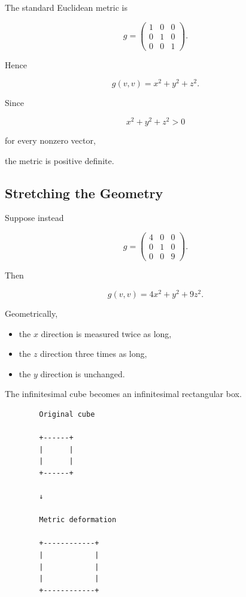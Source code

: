 \documentclass[12pt,a4paper]{article}
\theoremstyle{notespace}
\begin{document}
The standard Euclidean metric is

\[
g=
\begin{pmatrix}
	1&0&0\\
	0&1&0\\
	0&0&1
\end{pmatrix}.
\]

Hence

\[
g(v,v)
=
x^2+y^2+z^2.
\]

Since

\[
x^2+y^2+z^2>0
\]

for every nonzero vector,

the metric is positive definite.


\subsection{Stretching the Geometry}

Suppose instead

\[
g=
\begin{pmatrix}
	4&0&0\\
	0&1&0\\
	0&0&9
\end{pmatrix}.
\]

Then

\[
g(v,v)
=
4x^2+y^2+9z^2.
\]

Geometrically,

\begin{itemize}
	\item the $x$ direction is measured twice as long,
	\item the $z$ direction three times as long,
	\item the $y$ direction is unchanged.
\end{itemize}

The infinitesimal cube becomes an infinitesimal rectangular box.

\bigskip

\begin{center}
	\begin{verbatim}
		Original cube
		
		+------+
		|      |
		|      |
		+------+
		
		↓
		
		Metric deformation
		
		+------------+
		|            |
		|            |
		|            |
		+------------+
	\end{verbatim}
\end{center}
\end{document}
